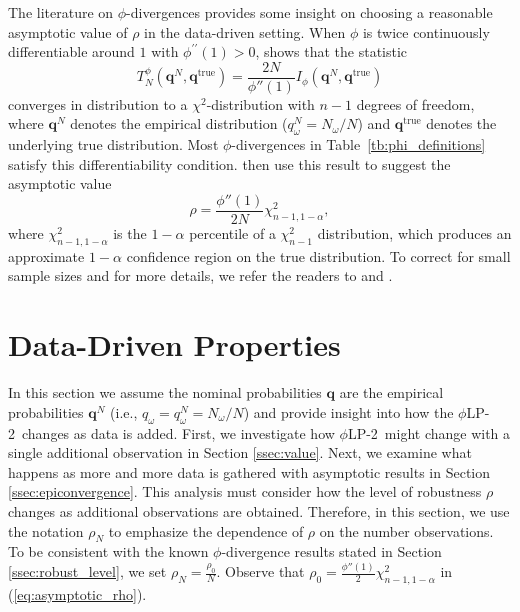 \documentclass[opre,nonblindrev]{informs3} %
\newcommand{\q}{\mathbf{q}}
\newcommand{\qtrue}{\q^{\text{true}}}
\newcommand{\plp}{$\phi$LP-2}
\begin{document}
The literature on $\phi$-divergences provides some insight on choosing a reasonable asymptotic value of $\rho$ in the data-driven setting. 
When $\phi$ is twice continuously differentiable around $1$ with $\phi^{\prime \prime}(1)>0$, \citet[Theorem 3.1]{pardo2005statistical} shows that the statistic
\[
	T^\phi_N(\q^N,\qtrue) = \frac{2N}{\phi''(1)} I_{\phi}(\q^N, \qtrue)
\]
converges in distribution to a $\chi^2$-distribution with $n-1$ degrees of freedom, where $\q^N$ denotes the empirical distribution ($q^N_\omega = N_\omega/N$) and $\qtrue$ denotes the underlying true distribution.
Most $\phi$-divergences in Table~\ref{tb:phi_definitions} satisfy this differentiability condition.
\citet{bental2011robust} then use this result to suggest the asymptotic value
\begin{equation} \label{eq:asymptotic_rho}
	\rho = \frac{\phi''(1)}{2N} \chi^2_{n-1,1-\alpha},
\end{equation}
where $\chi^2_{n-1,1-\alpha}$ is the $1-\alpha$ percentile of a $\chi^2_{n-1}$ distribution, which produces an approximate $1-\alpha$ confidence region on the true distribution.
To correct for small sample sizes and for more details, we refer the readers to \cite{pardo2005statistical} and \cite{bental2011robust}. 


\section{Data-Driven Properties}
\label{sec:properties}

In this section we assume the nominal probabilities $\q$ are the empirical probabilities $\q^{N}$ (i.e., $q_\omega=q_\omega^N = {N_\omega}/{N}$) and provide insight into how the \plp\ changes as data is added.
First, we investigate how \plp\ might change with a single additional observation in Section \ref{ssec:value}. 
Next, we examine what happens as more and more data is gathered with asymptotic results in Section \ref{ssec:epiconvergence}.
This analysis must consider how the level of robustness $\rho$ changes as additional observations are obtained. 
Therefore, in this section, we use the notation $\rho_N$ to emphasize the dependence of $\rho$ on the number observations.
To be consistent with the known $\phi$-divergence results stated in Section \ref{ssec:robust_level}, we set $\rho_N = \frac{\rho_0}{N}$.
Observe that $\rho_0=\frac{\phi''(1)}{2} \chi^2_{n-1,1-\alpha}$ in (\ref{eq:asymptotic_rho}). 
\end{document}
